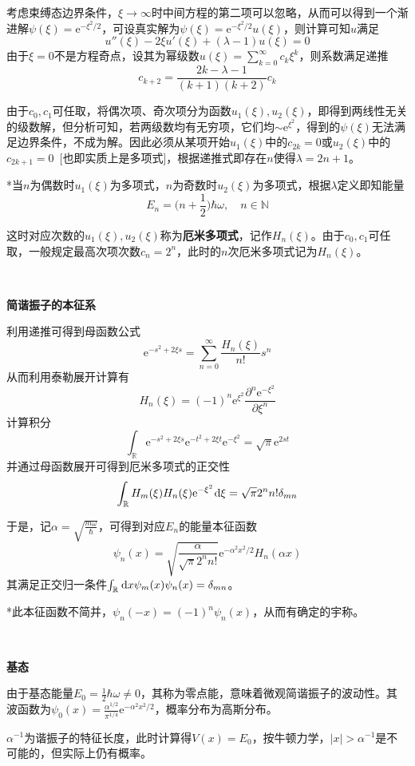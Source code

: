 \documentclass[a4paper,UTF8,fontset=windows]{ctexart}
\newcommand*{\dr}{\hspace{0.07em}\mathrm{d}}
\newcommand*{\er}{\mathrm{e}}
\begin{document}
考虑束缚态边界条件，$\xi\to\infty$时中间方程的第二项可以忽略，从而可以得到一个渐进解$\psi(\xi)=\er^{-\xi^2/2}$，可设真实解为$\psi(\xi)=\er^{-\xi^2/2}u(\xi)$，则计算可知$u$满足
$$u''(\xi)-2\xi u'(\xi)+(\lambda-1)u(\xi)=0$$
由于$\xi=0$不是方程奇点，设其为幂级数$u(\xi)=\sum_{k=0}^{\infty}c_k\xi^k$，则系数满足递推
$$c_{k+2}=\frac{2k-\lambda-1}{(k+1)(k+2)}c_k$$

由于$c_0,c_1$可任取，将偶次项、奇次项分为函数$u_1(\xi),u_2(\xi)$，即得到两线性无关的级数解，但分析可知，若两级数均有无穷项，它们均$\sim\er^{\xi^2}$，得到的$\psi(\xi)$无法满足边界条件，不成为解。因此必须从某项开始$u_1(\xi)$中的$c_{2k}=0$或$u_2(\xi)$中的$c_{2k+1}=0$\ [也即实质上是多项式]，根据递推式即存在$n$使得$\lambda=2n+1$。

*当$n$为偶数时$u_1(\xi)$为多项式，$n$为奇数时$u_2(\xi)$为多项式，根据$\lambda$定义即知能量
$$E_n=\bigg(n+\frac{1}{2}\bigg)\hbar\omega,\quad n\in\mathbb{N}$$

这时对应次数的$u_1(\xi),u_2(\xi)$称为\textbf{厄米多项式}，记作$H_n(\xi)$。由于$c_0,c_1$可任取，一般规定最高次项次数$c_n=2^n$，此时的$n$次厄米多项式记为$H_n(\xi)$。

\

\textbf{简谐振子的本征系}

利用递推可得到母函数公式
$$\er^{-s^2+2\xi s}=\sum_{n=0}^\infty\frac{H_n(\xi)}{n!}s^n$$
从而利用泰勒展开计算有
$$H_n(\xi)=(-1)^n\er^{\xi^2}\frac{\partial^n\er^{-\xi^2}}{\partial\xi^n}$$
计算积分
$$\int_\mathbb{R}\er^{-s^2+2\xi s}\er^{-t^2+2\xi t}\er^{-\xi^2}=\sqrt{\pi}\er^{2st}$$
并通过母函数展开可得到厄米多项式的正交性
$$\int_\mathbb{R}H_m(\xi)H_n(\xi)\er^{-\xi^2}\dr\xi=\sqrt{\pi}2^nn!\delta_{mn}$$

于是，记$\alpha=\sqrt{\frac{m\omega}{\hbar}}$，可得到对应$E_n$的能量本征函数
$$\psi_n(x)=\sqrt{\frac{\alpha}{\sqrt{\pi}2^nn!}}\er^{-\alpha^2x^2/2}H_n(\alpha x)$$
其满足正交归一条件$\int_\mathbb{R}\dr x\psi_m(x)\psi_n(x)=\delta_{mn}$。

*此本征函数不简并，$\psi_n(-x)=(-1)^n\psi_n(x)$，从而有确定的宇称。

\

\textbf{基态}

由于基态能量$E_0=\frac{1}{2}\hbar\omega\ne0$，其称为零点能，意味着微观简谐振子的波动性。其波函数为$\psi_0(x)=\frac{\alpha^{1/2}}{\pi^{1/4}}\er^{-\alpha^2x^2/2}$，概率分布为高斯分布。

$\alpha^{-1}$为谐振子的特征长度，此时计算得$V(x)=E_0$，按牛顿力学，$|x|>\alpha^{-1}$是不可能的，但实际上仍有概率。

\
\end{document}
